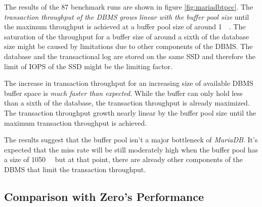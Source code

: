     The results of the \num{87} benchmark runs are shown in figure \ref{fig:mariadbtpcc}. The \emph{transaction throughput of the DBMS grows linear with the buffer pool size} until the maximum throughput is achieved at a buffer pool size of around \SI{1}{\gibi\byte}. The saturation of the throughput for a buffer size of around a sixth of the database size might be caused by limitations due to other components of the DBMS. The database and the transactional log are stored on the same SSD and therefore the limit of IOPS of the SSD might be the limiting factor.

    The increase in transaction throughput for an increasing size of available DBMS buffer space is \emph{much faster than expected}. While the buffer can only hold less than a sixth of the database, the transaction throughput is already maximized. The transaction throughput growth nearly linear by the buffer pool size until the maximum transaction throughput is achieved.

    The results suggest that the buffer pool isn't a major bottleneck of \emph{MariaDB}. It's expected that the miss rate will be still moderately high when the buffer pool has a size of \SI{1050}{\mebi\byte} but at that point, there are already other components of the DBMS that limit the transaction throughput.

\subsection{Comparison with Zero's Performance}

